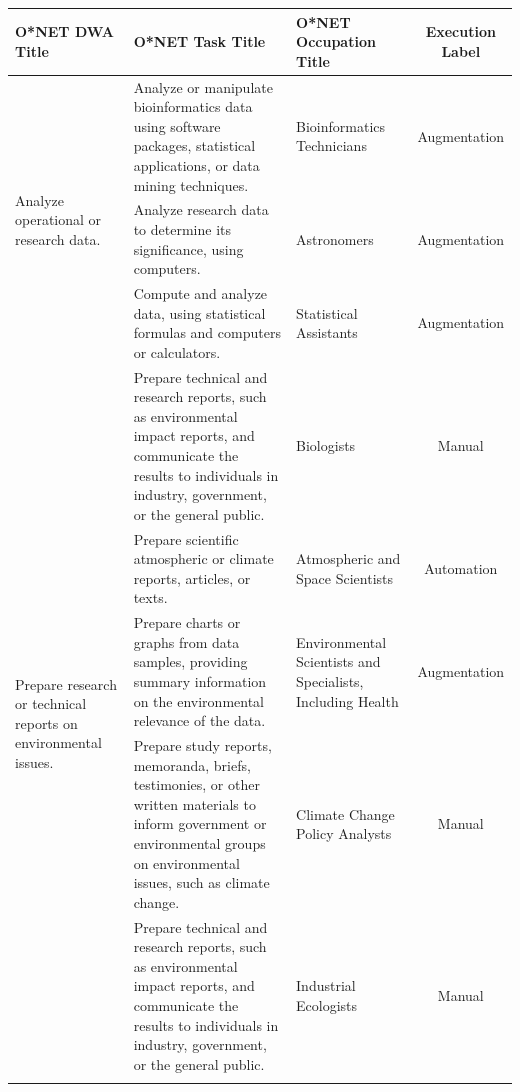 \begin{tabular}{|l|p{15cm}|l|c|}
\hline
\textbf{O*NET DWA Title} & \textbf{O*NET Task Title} & \textbf{O*NET Occupation Title} & \textbf{Execution Label} \\
\hline

\multirow{3}{*}{Analyze operational or research data.} &
Analyze or manipulate bioinformatics data using software packages, statistical applications, or data mining techniques. &
Bioinformatics Technicians & Augmentation \\ \cline{2-4}

& Analyze research data to determine its significance, using computers. &
Astronomers & Augmentation \\ \cline{2-4}

& Compute and analyze data, using statistical formulas and computers or calculators. &
Statistical Assistants & Augmentation \\ \hline


\multirow{6}{*}{Prepare research or technical reports on environmental issues.} & Prepare technical and research reports, such as environmental impact reports, and communicate the results to individuals in industry, government, or the general public. &
Biologists & Manual \\ \cline{2-4}

& Prepare scientific atmospheric or climate reports, articles, or texts. &
Atmospheric and Space Scientists & Automation \\ \cline{2-4}

& Prepare charts or graphs from data samples, providing summary information on the environmental relevance of the data. &
Environmental Scientists and Specialists, Including Health & Augmentation \\ \cline{2-4}

& Prepare study reports, memoranda, briefs, testimonies, or other written materials to inform government or environmental groups on environmental issues, such as climate change. &
Climate Change Policy Analysts & Manual \\ \cline{2-4}

& Prepare technical and research reports, such as environmental impact reports, and communicate the results to individuals in industry, government, or the general public. &
Industrial Ecologists & Manual \\ \cline{2-4}


\end{tabular}
